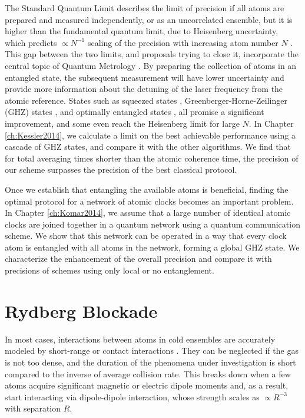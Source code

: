 The Standard Quantum Limit describes the limit of precision if all atoms are
prepared and measured independently, or as an uncorrelated ensemble, but it is
higher than the fundamental quantum limit, due to Heisenberg uncertainty, which
predicts $\propto N^{-1}$ scaling of the precision with increasing atom number
$N$ \cite{Hall2012}. This gap between the two limits, and proposals trying to
close it, incorporate the central topic of Quantum Metrology
\cite{Giovanetti2011, Escher:2011fn}. By preparing the collection of atoms in an entangled state, the subsequent
measurement will have lower uncertainty and provide more information about the
detuning of the laser frequency from the atomic reference. States such as
squeezed states \cite{Andre2004, Borregaard2013_nearHeisenberg},
Greenberger-Horne-Zeilinger (GHZ) states \cite{Wineland1998, Bollinger1996}, and
optimally entangled states \cite{Buzek1999, Berry2009}, all promise a
significant improvement, and some even reach the
Heisenberg limit for large $N$. In Chapter \ref{ch:Kessler2014}, we calculate
a limit on the best achievable performance using a cascade of GHZ states, and
compare it with the other algorithms. We find that for total averaging
times shorter than the atomic coherence time, the precision of our scheme
surpasses the precision of the best classical protocol.

Once we establish that entangling the available atoms is beneficial, finding the
optimal protocol for a network of atomic clocks becomes an important problem. In
Chapter \ref{ch:Komar2014}, we assume that a large number of identical atomic
clocks are joined together in a quantum network using a quantum communication
scheme. We show that this network can be operated in a way that every clock
atom is entangled with all atoms in the network, forming a global
GHZ state. We characterize the enhancement of the overall precision and compare
it with precisions of schemes using only local or no entanglement.





\section{Rydberg Blockade}
In most cases, interactions between atoms in cold ensembles are accurately
modeled by short-range or contact interactions \cite{Cheng2010}.
They can be neglected if the gas is not too dense, and the duration of the
phenomena under investigation is short compared to the inverse of average
collision rate. This breaks down when a few atoms acquire significant magnetic
or electric dipole moments and, as a result, start interacting via dipole-dipole
interaction, whose strength scales as $\propto R^{-3}$ with separation $R$.


